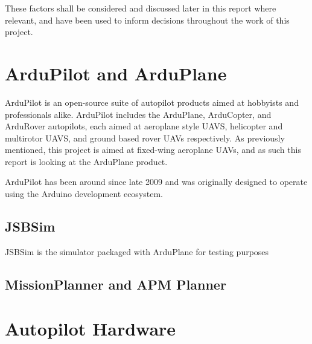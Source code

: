 These factors shall be considered and discussed later in this report where relevant, and have been used to inform decisions throughout the work of this project.

\section{ArduPilot and ArduPlane} 
\label{intro:arduplane}

ArduPilot is an open-source suite of autopilot products aimed at hobbyists and professionals alike. ArduPilot includes the ArduPlane, ArduCopter, and ArduRover autopilots, each aimed at aeroplane style UAVS, helicopter and multirotor UAVS, and ground based rover UAVs respectively. As previously mentioned, this project is aimed at fixed-wing aeroplane UAVs, and as such this report is looking at the ArduPlane product. 

ArduPilot has been around since late 2009 and was originally designed to operate using the Arduino development ecosystem.

\subsection{JSBSim}
\label{intro:jsbsim}

JSBSim is the simulator packaged with ArduPlane for testing purposes

\subsection{MissionPlanner and APM Planner}
\label{intro:planner}


\section{Autopilot Hardware} 
\label{intro:hardware}



